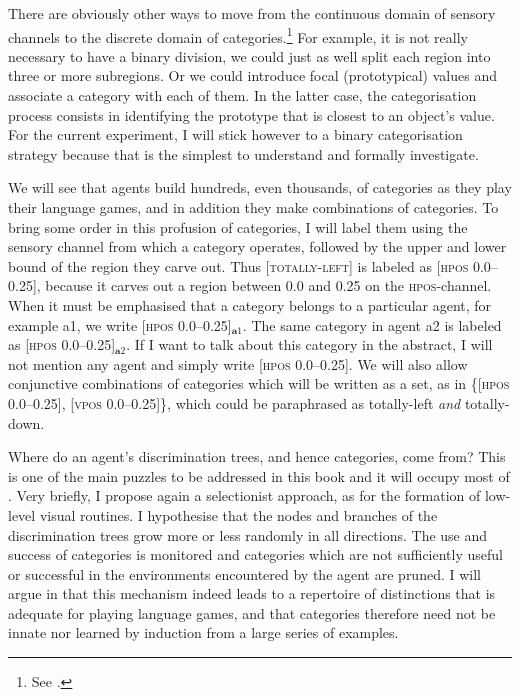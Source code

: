 There are obviously other ways to 
move from the continuous domain of sensory channels to 
the discrete domain of categories.\footnote{See  \cite{Taylor:1989}.}
For example, it is not really necessary 
to have a binary division, we could just as well split 
each region into three or more subregions. Or we could introduce
focal (prototypical) values and associate
a category with each of them. In the latter case, 
the categorisation process consists 
in identifying the prototype that is closest to 
an object's value. For the current experiment, I will stick however
to a binary categorisation strategy because that is
the simplest to understand and formally investigate. 

We will see that agents build hundreds,
even thousands, of categories as they play their
language games, and in addition they make combinations of 
categories. To bring some order in this profusion of 
categories, I will label them using the 
sensory channel from which a category operates, 
followed by the upper and lower bound of the region they 
carve out. Thus [\textsc{totally-left}]
is labeled as [\textsc{hpos} 0.0–0.25], because it carves 
out a region between 0.0 and 0.25 on the \textsc{hpos}-channel. 
When it must be emphasised that 
a category belongs to a particular agent, for example {\bfshape a1}, we
write [\textsc{hpos} 0.0–0.25]$_{\mathbf a1}$. The same category in agent {\bfshape a2}
is labeled as [\textsc{hpos} 0.0–0.25]$_{\mathbf a2}$. If I want to talk about 
this category in the abstract, I will not mention any 
agent and simply write [\textsc{hpos} 0.0–0.25]. We will also 
allow conjunctive combinations of categories which will be
written as a set, as in \{[\textsc{hpos} 0.0–0.25], [\textsc{vpos} 0.0–0.25]\}, 
which could be paraphrased as totally-left {\itshape and}
totally-down.  

Where do an agent's discrimination trees, and hence
categories, come from? This is one of the main 
puzzles to be addressed in this book and it will 
occupy most of . Very briefly, 
I propose again a selectionist approach, as for
the formation of low-level visual routines. I hypothesise
that the nodes and branches of the discrimination trees
grow more or less randomly in all directions. The use and
success of categories is monitored and categories which 
are not sufficiently useful or successful in the environments
encountered by the agent are pruned. I will argue in 
that this mechanism indeed leads to 
a repertoire of distinctions that is adequate for 
playing language games, and that 
categories therefore need not be innate nor learned by 
induction from a large series of examples. 

